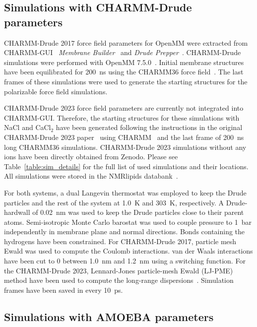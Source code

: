 \documentclass[journal=jacsat,manuscript=article,layout=singlecolumn]{achemso}
\begin{document}
\subsection{Simulations with CHARMM-Drude parameters}

CHARMM-Drude 2017 force field parameters for OpenMM were extracted from CHARMM-GUI~\cite{jo2008charmm,lee2016charmm} \textit{Membrane Builder}~\cite{wu2014charmm,jo2009charmm,jo2007automated,lee2018charmm} and \textit{Drude Prepper}~\cite{kognole2022charmm}. 
CHARMM-Drude simulations were performed with OpenMM 7.5.0~\cite{eastman2017openmm}.
Initial membrane structures have been equilibrated for 200~ns using the CHARMM36 force field~\cite{klauda2010update}. The last frames of these simulations were used to generate the starting structures for the polarizable force field simulations.

CHARMM-Drude 2023 force field parameters are currently not integrated into CHARMM-GUI. Therefore, the starting structures for these simulations with NaCl and CaCl$_{2}$ have been generated following the instructions in the original CHARMM-Drude 2023 paper~\cite{yu2023drude} using CHARMM~\cite{brooks2009charmm} and the last frame of 200~ns long CHARMM36 simulations. CHARMM-Drude 2023 simulations without any ions have been directly obtained from Zenodo. Please see Table~\ref{table:sim_details} for the full list of used simulations and their locations. All simulations were stored in the NMRlipids databank~\cite{Databank}.

For both systems, a dual Langevin thermostat was employed to keep the Drude particles and the rest of the system at 1.0~K and 303~K, respectively. A Drude-hardwall of 0.02~nm was used to keep the Drude particles close to their parent atoms. Semi-isotropic Monte Carlo barostat was used to couple pressure to 1~bar independently in membrane plane and normal directions. %
Bonds containing the hydrogens have been constrained. For CHARMM-Drude 2017, particle mesh Ewald was used to compute the Coulomb interactions. van der Waals interactions have been cut to 0 between 1.0~nm and 1.2~nm using a switching function. For the CHARMM-Drude 2023, Lennard-Jones particle-mesh Ewald (LJ-PME) method have been used to compute the long-range dispersions~\cite{wennberg2013lennard}. Simulation frames have been saved in every 10~ps.


\subsection{Simulations with AMOEBA parameters}
\end{document}
